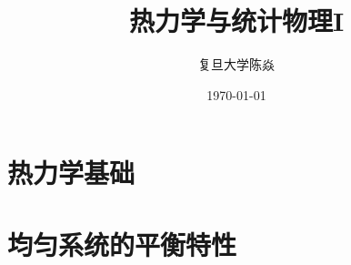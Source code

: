\documentclass[UTF8]{ctexbook}
\title{
	\vspace{-4 cm}
	\bfseries
	热力学与统计物理I
}
\author{
	\CJKfamily{楷体}
	复旦大学\phantom{空格}陈焱
}
\date{
	\CJKfamily{楷体}
	\today
}
\numberwithin{equation}{section}
\theoremstyle{empty} %
\theoremstyle{empty} %
\theoremstyle{plain} %
\let \oldInclude = 
\renewcommand{}[1]{{\let \clearpage = \relax \oldInclude{#1}}}
\begin{document}
%	
%			
%			
%			
%			
%			
		\chapter{热力学基础}
			
			
		\chapter{均匀系统的平衡特性}
			
			
%			
%			
%			
%			
		
\end{document}
